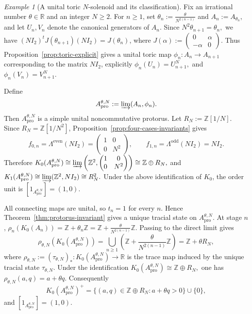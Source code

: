 \documentclass[11pt]{amsart}
\theoremstyle{definition}
\theoremstyle{remark}
\newtheorem{example}[theorem]{Example}
\newcommand{\Z}{\mathbb{Z}}
\newcommand{\R}{\mathbb{R}}
\newcommand{\ex}{\mathrm{pro}}
\begin{document}
\begin{example}[A unital toric $N$-solenoid and its classification]
\label{ex:solenoid}
Fix an irrational number $\theta\in\R$ and an integer $N\geq2$. For
$n\geq1$, set $\theta_n:=\frac{\theta}{N^{2(n-1)}}$ and $A_n:=A_{\theta_n}$,
and let $U_n,V_n$ denote the canonical generators of $A_n$. Since $N^2\theta_{n+1}=\theta_n,$
we have $(NI_2)^tJ(\theta_{n+1})(NI_2)=J(\theta_n)$, where
$J(\alpha):=
\begin{pmatrix}
0&\alpha\\
-\alpha&0
\end{pmatrix}.$
Thus Proposition~\ref{prop:toric-explicit} gives a unital toric map $\phi_n\colon A_n\to A_{n+1}$
corresponding to the matrix $NI_2$, explicitly $\phi_n(U_n)=U_{n+1}^{N},$ and
$\phi_n(V_n)=V_{n+1}^{N}.$

Define
\[
A_{\ex}^{\theta,N}:=\varinjlim(A_n,\phi_n).
\]
Then $A_{\ex}^{\theta,N}$ is a simple unital noncommutative protorus. Let $R_N:=\Z[1/N].$
Since $R_N=\Z[1/N^2]$, Proposition~\ref{prop:four-cases-invariants} gives
\[
f_{0,n}
=
\Lambda^{\mathrm{even}}(NI_2)
=
\begin{pmatrix}
1&0\\
0&N^2
\end{pmatrix},
\qquad
f_{1,n}
=
\Lambda^{\mathrm{odd}}(NI_2)
=
NI_2.
\]
Therefore
$K_0(A_{\ex}^{\theta,N})
\cong
\varinjlim\left(\Z^2,
\begin{pmatrix}
1&0\\
0&N^2
\end{pmatrix}
\right)
\cong
\Z\oplus R_N,$
and $K_1(A_{\ex}^{\theta,N})
\cong
\varinjlim(\Z^2,NI_2)
\cong
R_N^2.$
Under the above identification of $K_0$, the order unit is $[1_{A_{\ex}^{\theta,N}}]=(1,0).$

All connecting maps are unital, so $t_n=1$ for every $n$. Hence
Theorem~\ref{thm:protorus-invariant} gives a unique tracial state on
$A_{\ex}^{\theta,N}$. At stage $n$, $\rho_n(K_0(A_n))
=
\Z+\theta_n\Z
=
\Z+\frac{\theta}{N^{2(n-1)}}\Z.$
Passing to the direct limit gives
\[
\rho_{\theta,N}(K_0(A_{\ex}^{\theta,N}))
=
\bigcup_{n\geq1}
\left(
\Z+\frac{\theta}{N^{2(n-1)}}\Z
\right)
=
\Z+\theta R_N,
\]
where $\rho_{\theta,N}:=(\tau_{\theta,N})_*
\colon K_0(A_{\ex}^{\theta,N})\to\R$
is the trace map induced by the unique tracial state \(\tau_{\theta,N}\).
Under the identification $K_0(A_{\ex}^{\theta,N})\cong \Z\oplus R_N,$
one has $\rho_{\theta,N}(a,q)=a+\theta q.$
Consequently
\[
K_0(A_{\ex}^{\theta,N})^+
=
\{(a,q)\in \Z\oplus R_N : a+\theta q>0\}\cup\{0\},
\]
and $[1_{A_{\ex}^{\theta,N}}]=(1,0).$


\end{example}
\end{document}
